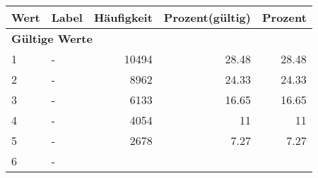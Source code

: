     \begin{longtable}{lXrrr}
     \toprule
     \textbf{Wert} & \textbf{Label} & \textbf{Häufigkeit} & \textbf{Prozent(gültig)} & \textbf{Prozent} \\
     \endhead
     \midrule
     \multicolumn{5}{l}{\textbf{Gültige Werte}}\\

     1 &
     \multicolumn{1}{X}{ -  } &


       \num{10494} &
       \num[round-mode=places,round-precision=2]{28,48} &
         \num[round-mode=places,round-precision=2]{28,48} \\

     2 &
     \multicolumn{1}{X}{ -  } &


       \num{8962} &
       \num[round-mode=places,round-precision=2]{24,33} &
         \num[round-mode=places,round-precision=2]{24,33} \\

     3 &
     \multicolumn{1}{X}{ -  } &


       \num{6133} &
       \num[round-mode=places,round-precision=2]{16,65} &
         \num[round-mode=places,round-precision=2]{16,65} \\

     4 &
     \multicolumn{1}{X}{ -  } &


       \num{4054} &
       \num[round-mode=places,round-precision=2]{11} &
         \num[round-mode=places,round-precision=2]{11} \\

     5 &
     \multicolumn{1}{X}{ -  } &


       \num{2678} &
       \num[round-mode=places,round-precision=2]{7,27} &
         \num[round-mode=places,round-precision=2]{7,27} \\

     6 &
     \multicolumn{1}{X}{ -  } &



\end{longtable}
